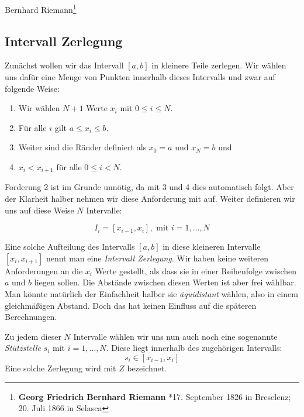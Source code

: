 Bernhard Riemann\footnote{\textbf{Georg Friedrich Bernhard Riemann} *17. September 1826 in Breselenz; 20. Juli 1866 in Selasca} 

\subsection{Intervall Zerlegung}

\begin{definition}\label{def:zerlegung}
Zunächst wollen wir das Intervall $[a,b]$ in kleinere Teile zerlegen. Wir wählen uns dafür eine Menge von Punkten innerhalb dieses Intervalls und zwar auf folgende Weise:

\begin{enumerate}
\item Wir wählen $N+1$ Werte $x_i$ mit $0\le i \le N$.
\item Für alle $i$ gilt $a\le x_i \le b$.
\item Weiter sind die Ränder definiert als $x_0=a$ und $x_N=b$ und
\item $x_i < x_{i+1}$ für alle $0\le i < N$.
\end{enumerate}
Forderung 2 ist im Grunde unnötig, da mit 3 und 4 dies automatisch folgt. Aber der Klarheit halber nehmen wir diese Anforderung mit auf. Weiter definieren wir uns auf diese Weise $N$ Intervalle:

\begin{equation}
I_i = [x_{i-1},x_{i}], \text{ mit } i=1, \dots , N
\end{equation}
\end{definition}

Eine solche Aufteilung des Intervalls $[a,b]$ in diese kleineren Intervalle $[x_i,x_{i+1}]$ nennt man eine \emph{Intervall Zerlegung}. Wir haben keine weiteren Anforderungen an die $x_i$ Werte gestellt, als dass sie in einer Reihenfolge zwischen $a$ und $b$ liegen sollen. Die Abstände zwischen diesen Werten ist aber frei wählbar. Man könnte natürlich der Einfachheit halber sie \emph{äquidistant} wählen, also in einem gleichmäßigen Abstand. Doch das hat keinen Einfluss auf die späteren Berechnungen. 

\begin{definition}
Zu jedem dieser $N$ Intervalle wählen wir uns nun auch noch eine sogenannte \emph{Stützstelle} $s_i$ mit $i=1, \dots , N$. Diese liegt innerhalb des zugehörigen Intervalls:
\begin{equation}
s_i \in [x_{i-1},x_{i}]
\end{equation}
Eine solche Zerlegung wird mit $Z$ bezeichnet.
\end{definition}


